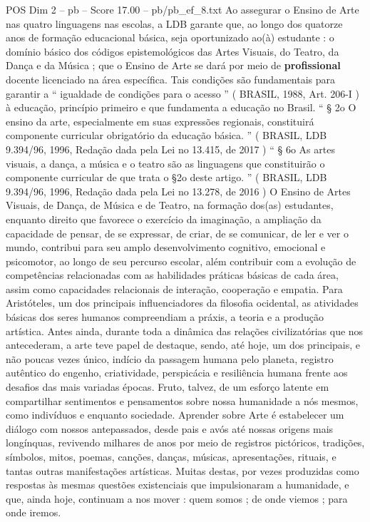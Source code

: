 \begin{textsample}{POS Dim 2 – pb – Score 17.00 – pb/pb\_ef\_8.txt}
Ao assegurar o Ensino de Arte nas quatro linguagens nas escolas, a LDB garante que, ao longo dos quatorze anos de formação educacional básica, seja oportunizado ao(à) estudante : o domínio básico dos códigos epistemológicos das Artes Visuais, do Teatro, da Dança e da Música ; que o Ensino de Arte se dará por meio de \textbf{profissional} docente licenciado na área específica.
Tais condições são fundamentais para garantir a “ igualdade de condições para o acesso ” ( BRASIL, 1988, Art. 206-I ) à educação, princípio primeiro e que fundamenta a educação no Brasil. “ § 2o O ensino da arte, especialmente em suas expressões regionais, constituirá componente curricular obrigatório da educação básica. ” ( BRASIL, LDB 9.394/96, 1996, Redação dada pela Lei no 13.415, de 2017 ) “ § 6o As artes visuais, a dança, a música e o teatro são as linguagens que constituirão o componente curricular de que trata o §2o deste artigo. ” ( BRASIL, LDB 9.394/96, 1996, Redação dada pela Lei no 13.278, de 2016 ) O Ensino de Artes Visuais, de Dança, de Música e de Teatro, na formação dos(as) estudantes, enquanto direito que favorece o exercício da imaginação, a ampliação da capacidade de pensar, de se expressar, de criar, de se comunicar, de ler e ver o mundo, contribui para seu amplo desenvolvimento cognitivo, emocional e psicomotor, ao longo de seu percurso escolar, além contribuir com a evolução de competências relacionadas com as habilidades práticas básicas de cada área, assim como capacidades relacionais de interação, cooperação e empatia.
Para Aristóteles, um dos principais influenciadores da filosofia ocidental, as atividades básicas dos seres humanos compreendiam a práxis, a teoria e a produção artística.
Antes ainda, durante toda a dinâmica das relações civilizatórias que nos antecederam, a arte teve papel de destaque, sendo, até hoje, um dos principais, e não poucas vezes único, indício da passagem humana pelo planeta, registro autêntico do engenho, criatividade, perspicácia e resiliência humana frente aos desafios das mais variadas épocas.
Fruto, talvez, de um esforço latente em compartilhar sentimentos e pensamentos sobre nossa humanidade a nós mesmos, como indivíduos e enquanto sociedade.
Aprender sobre Arte é estabelecer um diálogo com nossos antepassados, desde pais e avós até nossas origens mais longínquas, revivendo milhares de anos por meio de registros pictóricos, tradições, símbolos, mitos, poemas, canções, danças, músicas, apresentações, rituais, e tantas outras manifestações artísticas.
Muitas destas, por vezes produzidas como respostas às mesmas questões existenciais que impulsionaram a humanidade, e que, ainda hoje, continuam a nos mover : quem somos ; de onde viemos ; para onde iremos.

\end{textsample}
